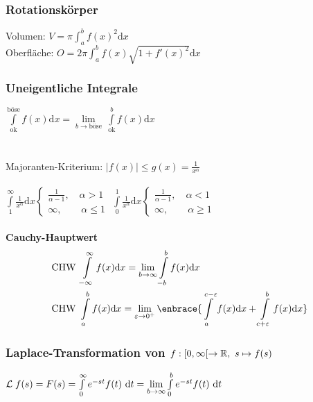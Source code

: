 \documentclass[german]{latex4ei/latex4ei_sheet}
\begin{document}
\begin{sectionbox}
    
    \subsubsection{Rotationskörper}
    Volumen: $V = \pi \int_a^b f(x)^2 \mathrm dx$\\
    Oberfläche: $O = 2 \pi \int_a^b f(x) \sqrt{1 + f'(x)^2} \mathrm dx$
    
    \subsubsection{Uneigentliche Integrale}
    $\int\limits_{\text{ok}}^{\text{böse}} f(x) \mathrm dx = \lim\limits_{b\rightarrow \text{böse}}\ \int\limits_{\text{ok}}^b f(x) \mathrm dx$\\ \\ \\
    Majoranten-Kriterium: $|f(x)|\le g(x) = \frac1{x^\alpha}$\\ \\
    $\int\limits_{1}^{\infty} \frac{1}{x^\alpha} \mathrm dx \begin{cases} \frac{1}{\alpha -1}, \quad \alpha > 1 \\ \infty, \qquad \alpha \le 1 \end{cases}$ \qquad
    $\int\limits_{0}^{1} \frac{1}{x^\alpha} \mathrm dx \begin{cases} \frac{1}{\alpha -1}, \quad \alpha < 1 \\ \infty, \qquad \alpha \ge 1 \end{cases}$\\ \\
    \textbf{Cauchy-Hauptwert}
    \begin{eqnarray*}
    & \text{CHW }\int\limits_{-\infty}^{\infty} f(x) \mathrm dx = \lim\limits_{b\rightarrow\infty} \int\limits_{-b}^b f(x) \mathrm dx \\
    & \text{CHW }\int\limits_{a}^{b} f(x) \mathrm dx=\lim\limits_{\varepsilon \rightarrow 0^+}\enbrace{\int\limits_{a}^{c-\varepsilon} f(x) \mathrm dx+\int\limits_{c+\varepsilon}^{b}f(x)\mathrm dx}
    \end{eqnarray*}
    
    \subsubsection{Laplace-Transformation von $f: [0,\infty[ \rightarrow \mathbb R,\ s \mapsto f(s)$}
    $\mathcal L \; f(s) = F(s) = \int\limits_{0}^{\infty} e^{-st} f(t)\ \mathrm dt = \lim\limits_{b \rightarrow \infty} \int\limits_{0}^{b} e^{-st} f(t)\ \mathrm dt$
    

\end{sectionbox}
\end{document}
